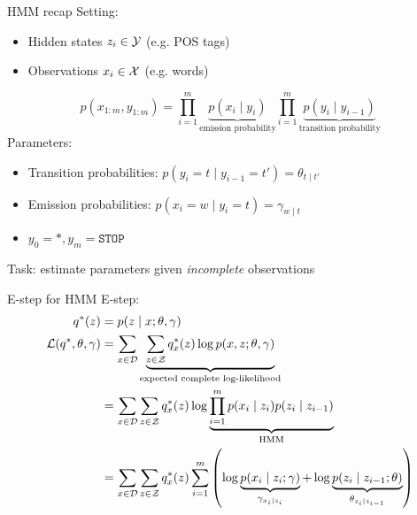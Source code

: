 \documentclass[usenames,dvipsnames,notes,11pt,aspectratio=169]{beamer}
\begin{document}
\begin{frame}
    {HMM recap}
    Setting:\\
    \begin{itemize}
        \item Hidden states $z_i \in \mathcal{Y}$ (e.g. POS tags)
        \item Observations $x_i\in \mathcal{X}$ (e.g. words)
    \end{itemize}
    $$
    p(x_{1:m},y_{1:m}) = \prod_{i=1}^m \underbrace{p(x_i\mid y_i)}_{\text{emission probability}}
    \prod_{i=1}^m \underbrace{p(y_i\mid y_{i-1})}_{\text{transition probability}}
    $$
    Parameters:\\
    \begin{itemize}
        \item Transition probabilities: $p(y_i=t\mid y_{i-1}=t') = \theta_{t\mid t'}$
        \item Emission probabilities: $p(x_i=w\mid y_i=t) = \gamma_{w\mid t}$
        \item $y_0=*, y_m=\texttt{STOP}$
    \end{itemize}
    Task: estimate parameters given \emph{incomplete} observations
\end{frame}

\begin{frame}
    {E-step for HMM}
    E-step: 
    \begin{align*}
        q^*(z) &= p(z\mid x; \theta, \gamma) \\
        \mathcal{L}(q^*, \theta, \gamma) &= \sum_{x\in\mathcal{D}} \underbrace{\sum_{z\in\mathcal{Z}} q^*_x(z)
        \log p(x,z;\theta,\gamma)}_\text{expected complete log-likelihood} \\
        &= \sum_{x\in\mathcal{D}} \sum_{z\in\mathcal{Z}} q^*_x(z)
        \log \underbrace{\prod_{i=1}^m p(x_i\mid z_i) p(z_i\mid z_{i-1})}_{\text{HMM}} \\
        &= \sum_{x\in\mathcal{D}} \sum_{z\in\mathcal{Z}} q^*_x(z)
        \sum_{i=1}^m \left( 
            \log \underbrace{p(x_i\mid z_i; \gamma)}_{\gamma_{x_i\mid z_i}} + 
        \log \underbrace{p(z_i\mid z_{i-1}; \theta)}_{\theta_{z_i\mid z_{i-1}}} 
         \right)
    \end{align*}
\end{frame}
\end{document}

